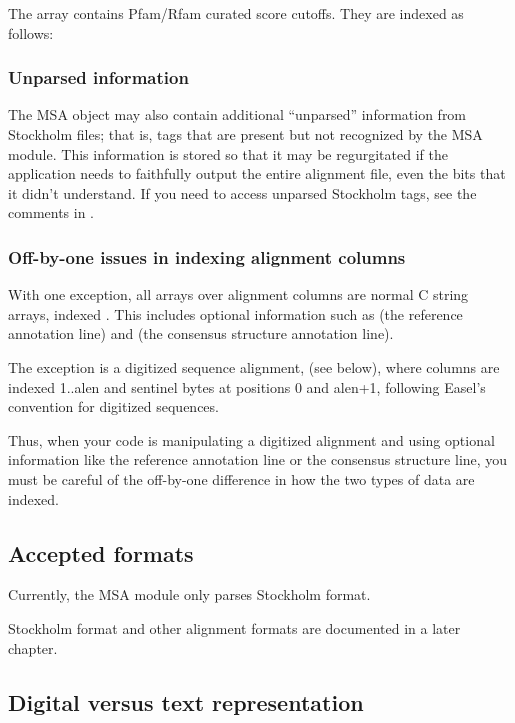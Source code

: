 The  array contains Pfam/Rfam curated score
cutoffs. They are indexed as follows:



\subsubsection{Unparsed information}

The MSA object may also contain additional ``unparsed'' information
from Stockholm files; that is, tags that are present but not
recognized by the MSA module. This information is stored so that it
may be regurgitated if the application needs to faithfully output the
entire alignment file, even the bits that it didn't understand. If you
need to access unparsed Stockholm tags, see the comments in
.

\subsubsection{Off-by-one issues in indexing alignment columns}

With one exception, all arrays over alignment columns are normal C
string arrays, indexed . This includes optional
information such as  (the reference annotation line)
and  (the consensus structure annotation line).

The exception is a digitized sequence alignment, 
(see below), where columns are indexed 1..alen and sentinel bytes at
positions 0 and alen+1, following Easel's convention for digitized
sequences.

Thus, when your code is manipulating a digitized alignment and using
optional information like the reference annotation line or the
consensus structure line, you must be careful of the off-by-one
difference in how the two types of data are indexed.

\subsection{Accepted formats}

Currently, the MSA module only parses Stockholm format. 

Stockholm format and other alignment formats are documented in a later
chapter.

\subsection{Digital versus text representation}

